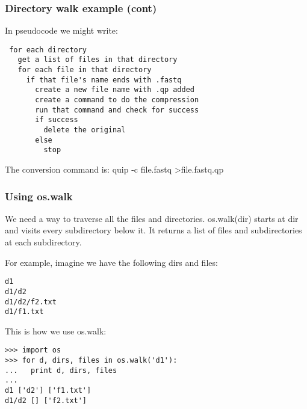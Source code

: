 \documentclass[10pt]{beamer}
\newcommand\smallfont{\fontsize{8pt}{7.2}\selectfont}
\begin{document}
\begin{frame}[fragile]
\frametitle{Directory walk example (cont)}
\smallfont
In pseudocode we might write:
\begin{verbatim}
 for each directory
   get a list of files in that directory
   for each file in that directory
     if that file's name ends with .fastq
       create a new file name with .qp added
       create a command to do the compression
       run that command and check for success
       if success
         delete the original
       else
         stop
\end{verbatim}

The conversion command is: quip -c file.fastq \textgreater file.fastq.qp 

\end{frame}

\begin{frame}[fragile]
\frametitle{Using os.walk}

We need a way to traverse all the files and directories.
os.walk(dir) starts at dir and visits every subdirectory below it.
It returns a list of files and subdirectories at each subdirectory. 
\vspace{2mm}

For example, imagine we have the following dirs and files:

\smallfont
\begin{verbatim}
d1
d1/d2
d1/d2/f2.txt
d1/f1.txt
\end{verbatim}

This is how we use os.walk:

\smallfont
\begin{verbatim}
>>> import os
>>> for d, dirs, files in os.walk('d1'):
...   print d, dirs, files
... 
d1 ['d2'] ['f1.txt']
d1/d2 [] ['f2.txt']
\end{verbatim}
\end{frame}
\end{document}
